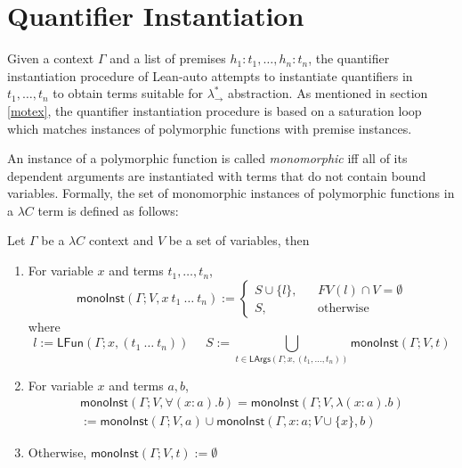 \section{Quantifier Instantiation}
Given a context $\Gamma$ and a list of premises $h_1 : t_1, \dots, h_n : t_n$, the quantifier
instantiation procedure of Lean-auto attempts to instantiate quantifiers in
$t_1, \dots, t_n$ to obtain terms suitable for $\lambda_\to^*$ abstraction.
As mentioned in section \ref{motex}, the quantifier instantiation procedure
is based on a saturation loop which matches instances of polymorphic functions
with premise instances.

\noindent An instance of a polymorphic function is called \textit{monomorphic} iff all
of its dependent arguments are instantiated with terms that do not contain bound
variables. Formally, the set of monomorphic instances of polymorphic functions in a
$\lambda C$ term is defined as follows:

\begin{definition}
  Let $\Gamma$ be a $\lambda C$ context and $V$ be a set of variables, then
  \begin{enumerate}
    \item For variable $x$ and terms $t_1, \dots, t_n$,
      $$\mathsf{monoInst}(\Gamma; V, x \ t_1 \ \dots \ t_n) := \left\{
        \begin{aligned}
          S \cup \{l\}, & & FV(l) \cap V = \emptyset \\
          S, & & \text{otherwise}
        \end{aligned}
      \right.$$
      where
      $$l := \mathsf{LFun}(\Gamma; x, (t_1 \ \dots \ t_n)) \ \ \ \ \ \ S := \bigcup_{t \in \mathsf{LArgs}(\Gamma; x, (t_1, \dots, t_n))} \mathsf{monoInst}(\Gamma; V, t)$$
    \item For variable $x$ and terms $a, b$,
      \begin{align*}
        \mathsf{monoInst}(\Gamma; V, \forall (x : a). b) = \mathsf{monoInst}(\Gamma; V, \lambda (x : a). b) 
        \\ := \mathsf{monoInst}(\Gamma; V, a) \cup \mathsf{monoInst}(\Gamma, x : a; V \cup \{x\}, b)
      \end{align*}
    \item Otherwise, $\mathsf{monoInst}(\Gamma; V, t) := \emptyset$
  \end{enumerate}
\end{definition}